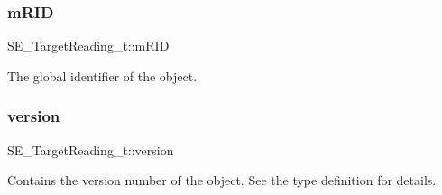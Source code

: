 \subsubsection{\texorpdfstring{m\+R\+ID}{mRID}}
{\footnotesize\ttfamily S\+E\+\_\+\+Target\+Reading\+\_\+t\+::m\+R\+ID}

The global identifier of the object. \mbox{\label{group__TargetReading_gae96ed0578c2f7248515997778cee5da8}} 
\subsubsection{\texorpdfstring{version}{version}}
{\footnotesize\ttfamily S\+E\+\_\+\+Target\+Reading\+\_\+t\+::version}

Contains the version number of the object. See the type definition for details. 